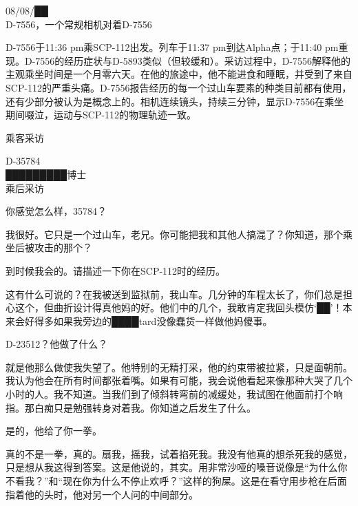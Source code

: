 
\begin{scpbox}

08\slash 08\slash ██\\
D-7556，一个常规相机对着D-7556

D-7556于11:36 pm乘SCP-112出发。列车于11:37 pm到达Alpha点；于11:40 pm重现。D-7556的经历症状与D-5893类似（但较缓和）。采访过程中，D-7556解释他的主观乘坐时间是一个月零六天。在他的旅途中，他不能进食和睡眠，并受到了来自SCP-112的严重头痛。D-7556报告经历的每一个过山车要素的种类目前都有使用，还有少部分被认为是概念上的。相机连续镜头，持续三分钟，显示D-7556在乘坐期间啜泣，运动与SCP-112的物理轨迹一致。

\end{scpbox}

乘客采访




\begin{scpbox}

D-35784\\
█████████博士\\
乘后采访

你感觉怎么样，35784？

我很好。它只是一个过山车，老兄。你可能把我和其他人搞混了？你知道，那个乘坐后被攻击的那个？

到时候我会的。请描述一下你在SCP-112时的经历。

这有什么可说的？在我被送到监狱前，我山车。几分钟的车程太长了，你们总是担心这个，但曲折设计得真他妈的好。他们中的几个，我敢肯定我回头模仿‘██’！本来会好得多如果我旁边的████tard没像蠢货一样做他妈傻事。

D-23512？他做了什么？

就是他那么做使我失望了。他特别的无精打采，他的约束带被拉紧，只是面朝前。我认为他会在所有时间都张着嘴。如果有可能，我会说他看起来像那种大哭了几个小时的人。我不知道。当我们到了倾斜转弯前的减缓处，我试图在他面前打个响指。那白痴只是勉强转身对着我。你知道之后发生了什么。

是的，他给了你一拳。

真的不是一拳，真的。扇我，摇我，试着掐死我。我没有他真的想杀死我的感觉，只是想从我这得到答案。这是他说的，其实。用非常沙哑的嗓音说像是“为什么你不看我？”和“现在你为什么不停止欢呼？”这样的狗屎。这是在看守用步枪在后面指着他的头时，他对另一个人问的中间部分。

\end{scpbox}

